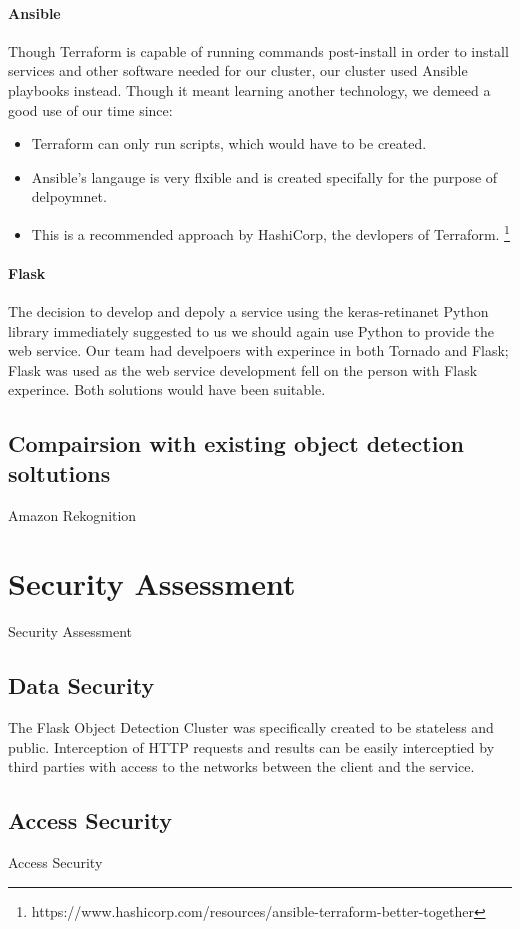 \documentclass[conference]{IEEEtran}
\begin{document}
\paragraph{Ansible}
Though Terraform is capable of running commands post-install in order to install services and other software needed for our cluster, our cluster used Ansible playbooks instead. Though it meant learning another technology, we demeed a good use of our time since:
\begin{itemize}
  \item Terraform can only run scripts, which would have to be created.
  \item Ansible's langauge is very flxible and is created specifally for the purpose of delpoymnet.
  \item This is a recommended approach by HashiCorp, the devlopers of Terraform. \footnote{https://www.hashicorp.com/resources/ansible-terraform-better-together}
\end{itemize}
\paragraph{Flask}
The decision to develop and depoly a service using the keras-retinanet Python library immediately suggested to us we should again use Python to provide the web service. Our team had develpoers with experince in both Tornado and Flask; Flask was used as the web service development fell on the person with Flask experince. Both solutions would have been suitable.
\subsection{Compairsion with existing object detection soltutions}
Amazon Rekognition
\section{Security Assessment}
Security Assessment
\subsection{Data Security}
The Flask Object Detection Cluster was specifically created to be stateless and public. Interception of HTTP requests and results can be easily interceptied by third parties with access to the networks between the client and the service.
\subsection{Access Security}
Access Security
\end{document}
